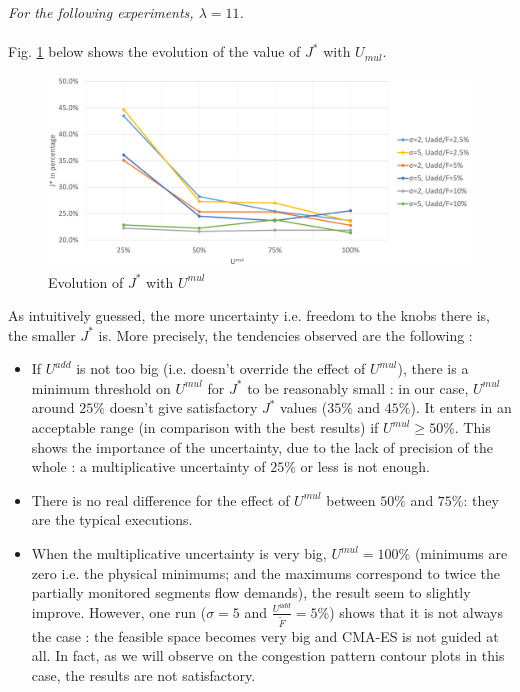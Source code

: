 \emph{For the following experiments, $\lambda=11$.}\\
\\
Fig. \ref{fig:umulevolution} below shows the evolution of the value of $J^{*}$ with $U_{mul}$.
\begin{figure}[!h]
	\label{fig:umulevolution}
	\caption{Evolution of $J^{*}$ with $U^{mul}$}
	\includegraphics[width=7in]{figures/umul.png}
\end{figure}
As intuitively guessed, the more uncertainty i.e. freedom to the knobs there is, the smaller $J^{*}$ is.
More precisely, the tendencies observed are the following :
\begin{itemize}
	\item If $U^{add}$ is not too big (i.e. doesn't override the effect of $U^{mul}$), there is a minimum threshold on $U^{mul}$ for $J^{*}$ to be reasonably small : in our case, $U^{mul}$ around $25\% $ doesn't give satisfactory $J^{*}$ values ($35\% $ and $45\% $). It enters in an acceptable range (in comparison with the best results) if $U^{mul}\geq 50\% $. This shows the importance of the uncertainty, due to the lack of precision of the whole : a multiplicative uncertainty of $25\% $ or less is not enough.
	\item There is no real difference for the effect of $U^{mul}$ between $50\% $ and $75\% $: they are the typical executions.
	\item When the multiplicative uncertainty is very big, $U^{mul}=100\% $ (minimums are zero i.e. the physical minimums; and the maximums correspond to twice the partially monitored segments flow demands), the result seem to slightly improve. However, one run ($\sigma=5$ and $\frac{U^{add}}{\widetilde{F}}=5\% $) shows that it is not always the case :  the feasible space becomes very big and CMA-ES is not guided at all. In fact, as we will observe on the congestion pattern contour plots in this case, the results are not satisfactory.
\end{itemize} 
